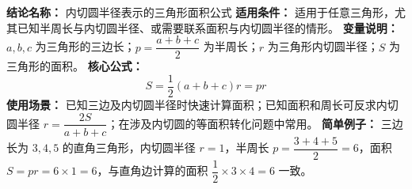 \textbf{结论名称：} 内切圆半径表示的三角形面积公式
\textbf{适用条件：} 适用于任意三角形，尤其已知半周长与内切圆半径、或需要联系面积与内切圆半径的情形。
\textbf{变量说明：} \(a,b,c\) 为三角形的三边长；\(p=\dfrac{a+b+c}{2}\) 为半周长；\(r\) 为三角形内切圆半径；\(S\) 为三角形的面积。
\textbf{核心公式：} 
\[
\boxed{S = \frac{1}{2}(a+b+c)r = p r}
\]
\textbf{使用场景：} 已知三边及内切圆半径时快速计算面积；已知面积和周长可反求内切圆半径 \(r=\dfrac{2S}{a+b+c}\)；在涉及内切圆的等面积转化问题中常用。
\textbf{简单例子：} 三边长为 \(3,4,5\) 的直角三角形，内切圆半径 \(r=1\)，半周长 \(p=\dfrac{3+4+5}{2}=6\)，面积 \(S = p r = 6\times 1 = 6\)，与直角边计算的面积 \(\dfrac{1}{2}\times 3\times 4 = 6\) 一致。